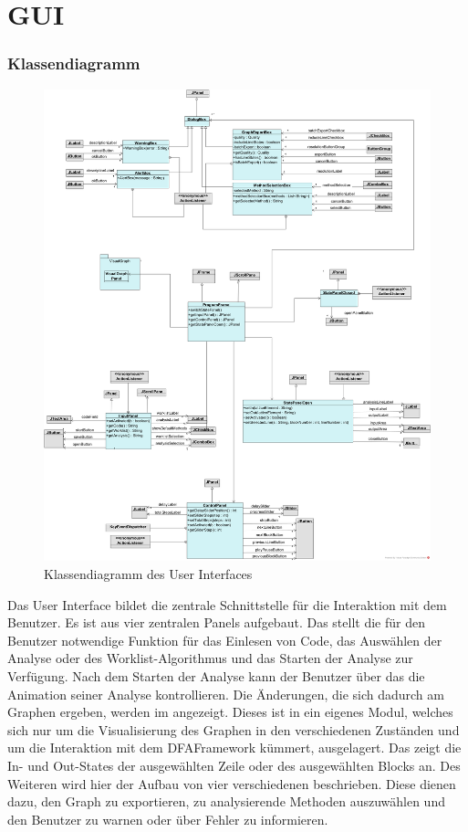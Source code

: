 \section{GUI}

\subsubsection{Klassendiagramm}

\begin{figure}[htbp] 
  \centering
  		 \includegraphics[width=1\textwidth]{Klassenuebersicht/GUI/GUI}
  \caption{Klassendiagramm des User Interfaces}
  \label{fig:UI}
\end{figure}

Das User Interface bildet die zentrale Schnittstelle für die Interaktion mit dem Benutzer.
Es ist aus vier zentralen Panels aufgebaut. 
Das  stellt die für den Benutzer notwendige Funktion für das Einlesen von Code, das Auswählen der Analyse oder des Worklist-Algorithmus und das Starten der Analyse zur Verfügung. 
Nach dem Starten der Analyse kann der Benutzer über das  die Animation seiner Analyse kontrollieren. 
Die Änderungen, die sich dadurch am Graphen ergeben, werden im  angezeigt. 
Dieses ist in ein eigenes Modul, welches sich nur um die Visualisierung des Graphen in den verschiedenen Zuständen und um die Interaktion mit dem DFAFramework kümmert, ausgelagert. 
Das  zeigt die In- und Out-States der ausgewählten Zeile oder des ausgewählten Blocks an. 
Des Weiteren wird hier der Aufbau von vier verschiedenen  beschrieben. Diese dienen dazu, den Graph zu exportieren, zu analysierende Methoden auszuwählen und den Benutzer zu warnen oder über Fehler zu informieren. 

